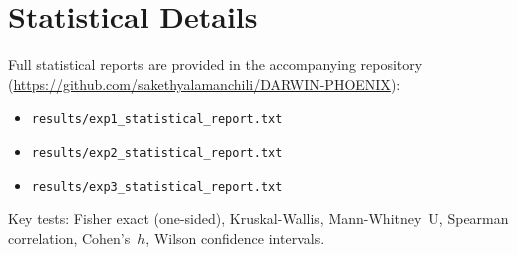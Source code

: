\documentclass[11pt,letterpaper]{article}
\begin{document}
\section{Statistical Details}

Full statistical reports are provided in the accompanying repository
(\url{https://github.com/sakethyalamanchili/DARWIN-PHOENIX}):
\begin{itemize}
  \item \texttt{results/exp1\_statistical\_report.txt}
  \item \texttt{results/exp2\_statistical\_report.txt}
  \item \texttt{results/exp3\_statistical\_report.txt}
\end{itemize}

Key tests: Fisher exact (one-sided), Kruskal-Wallis, Mann-Whitney~U,
Spearman correlation, Cohen's~$h$, Wilson confidence intervals.
\end{document}
